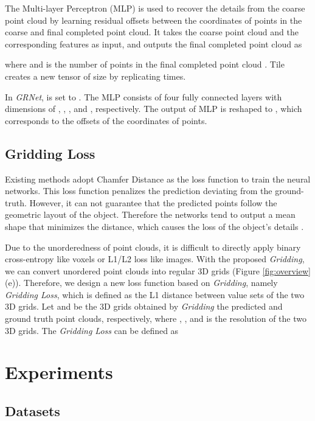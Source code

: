 \documentclass[runningheads]{llncs}
\begin{document}
The Multi-layer Perceptron (MLP) is used to recover the details from the coarse point cloud by learning residual offsets between the coordinates of points in the coarse and final completed point cloud.
It takes the coarse point cloud  and the corresponding features  as input, and outputs the final completed point cloud  as

where  and  is the number of points in the final completed point cloud .
Tile creates a new tensor of size  by replicating   times.

In {\it GRNet},  is set to .
The MLP consists of four fully connected layers with dimensions of , , , and , respectively.
The output of MLP is reshaped to , which corresponds to the offsets of the coordinates of  points.

\subsection{Gridding Loss}

Existing methods adopt Chamfer Distance \cite{DBLP:conf/cvpr/FanSG17} as the loss function to train the neural networks.
This loss function penalizes the prediction deviating from the ground-truth.
However, it can not guarantee that the predicted points follow the geometric layout of the object.
Therefore the networks tend to output a mean shape that minimizes the distance, which causes the loss of the object's details \cite{DBLP:conf/eccv/JiangSQJ18,DBLP:conf/nips/XuWCMN19}.

Due to the unorderedness of point clouds, it is difficult to directly apply binary cross-entropy like voxels or L1/L2 loss like images.
With the proposed {\it Gridding}, we can convert unordered point clouds into regular 3D grids (Figure \ref{fig:overview} (e)).
Therefore, we design a new loss function based on {\it Gridding}, namely {\it Gridding Loss}, which is defined as the L1 distance between value sets of the two 3D grids.
Let  and  be the 3D grids obtained by {\it Gridding} the predicted and ground truth point clouds, respectively, where , , and  is the resolution of the two 3D grids.
The {\it Gridding Loss} can be defined as


\section{Experiments}

\subsection{Datasets}
\end{document}
